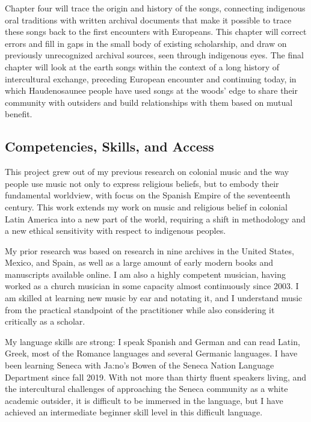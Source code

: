 \documentclass{neh}
\begin{document}
Chapter four will trace the origin and history of the songs, connecting
indigenous oral traditions with written archival documents that make it
possible to trace these songs back to the first encounters with Europeans.
This chapter will correct errors and fill in gaps in the small body of
existing scholarship, and draw on previously unrecognized archival sources,
seen through indigenous eyes.
The final chapter will look at the earth songs within the context of a long
history of intercultural exchange, preceding European encounter and continuing
today, in which Haudenosaunee people have used songs at the woods' edge to
share their community with outsiders and build relationships with them based
on mutual benefit.

\subsection{Competencies, Skills, and Access}


This project grew out of my previous research on colonial music and the way
people use music not only to express religious beliefs, but to embody
their fundamental worldview, with focus on the Spanish Empire of the
seventeenth century.
This work extends my work on music and religious belief in colonial Latin
America into a new part of the world, requiring a shift in methodology and a
new ethical sensitivity with respect to indigenous peoples.

My prior research was based on research in nine archives in the United States,
Mexico, and Spain, as well as a large amount of early modern books and
manuscripts available online.
I am also a highly competent musician, having worked as a church musician in
some capacity almost continuously since 2003.
I am skilled at learning new music by ear and notating it, and I understand
music from the practical standpoint of the practitioner while also considering
it critically as a scholar.

My language skills are strong: I speak Spanish and German and can read Latin,
Greek, most of the Romance languages and several Germanic languages.
I have been learning Seneca with Ja:no’s Bowen of the Seneca Nation Language
Department since fall 2019.
With not more than thirty fluent speakers living, and the intercultural
challenges of approaching the Seneca community as a white academic outsider,
it is difficult to be immersed in the language, but I have achieved an
intermediate beginner skill level in this difficult language.
\end{document}
